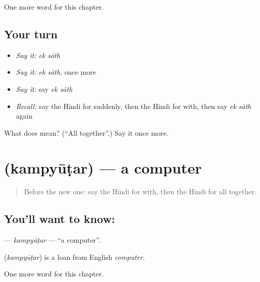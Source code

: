 \begin{grammarlens}[title={What you've built}]
One more word for this chapter.
\end{grammarlens}

\subsection*{Your turn}
\begin{itemize}
\raggedright
  \item \emph{Say it:} \emph{ek sāth}
  \item \emph{Say it:} \emph{ek sāth}, once more
  \item \emph{Say it:} say \emph{ek sāth}
  \item \emph{Recall:} say the Hindi for suddenly, then the Hindi for with, then say \emph{ek sāth} again
\end{itemize}

\begin{tcolorbox}[breakable,colback=teal!4,colframe=teal!35!black,title={Before you move on}]
What does   mean? (\textquotedblleft{}All together\textquotedblright{}.) Say it once more.
\end{tcolorbox}
\section[\texorpdfstring{\hi{कंप्यूटर} (kampyūṭar)}{कंप्यूटर (kampyūṭar)}]{ (kampyūṭar) — a computer}

\label{lesson:HI-C249-kampyutar}



\begin{quote}
Before the new one: say the Hindi for with, then the Hindi for all together.
\end{quote}

\subsection*{You'll want to know: }
\textbf{} — \emph{kampyūṭar} — \textquotedblleft{}a computer\textquotedblright{}.

\begin{cousinweb}
\textbf{} (\emph{kampyūṭar}) is a loan from English \emph{computer}.
\end{cousinweb}

\begin{grammarlens}[title={What you've built}]
One more word for this chapter.
\end{grammarlens}

